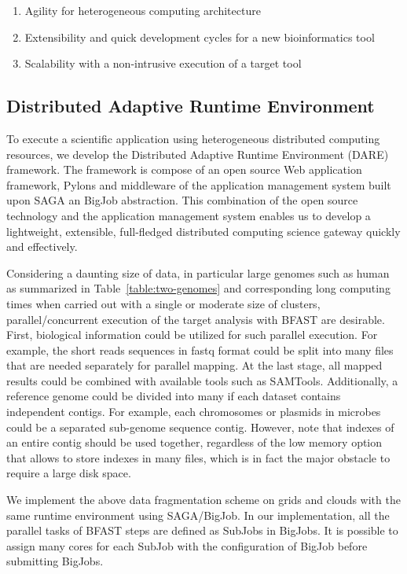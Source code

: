 \documentclass[12pt]{article}
\begin{document}
\begin{enumerate}
\item Agility for heterogeneous computing architecture
\item Extensibility and quick development cycles for a new bioinformatics tool
\item Scalability with a non-intrusive execution of a target tool  
\end{enumerate}

\subsection{Distributed Adaptive Runtime Environment}

To execute a scientific application using heterogeneous distributed computing resources, we develop the Distributed Adaptive Runtime Environment (DARE) framework\cite{dareurl}.  The framework is compose of an open source Web application framework, Pylons
and middleware of the application management system built upon SAGA an BigJob abstraction\cite{saga-ccgrid10,saga-royalsoc,saga-web,jha2009developing,ecmls10}.  This combination of the open source technology and the application management system enables us to develop a lightweight, extensible, full-fledged distributed computing science gateway quickly and effectively\cite{pylonsurl}. 

Considering a daunting size of data, in particular large genomes such as human as summarized in Table~\ref{table:two-genomes} and corresponding long computing times when carried out with a single or moderate size of clusters, parallel/concurrent execution of the target analysis with BFAST are desirable.  First, biological information could be utilized for such parallel execution. For example, the short reads sequences in fastq format could be split into many files that are needed separately for parallel mapping.  At the last stage, all mapped results could be combined with available tools such as SAMTools\cite{samtools}.   Additionally, a reference genome could be divided into many if each dataset contains independent contigs.  For example, each chromosomes or plasmids in microbes could be a separated sub-genome sequence contig.  However, note that indexes of an entire contig should be used together, regardless of the low memory option that allows to store indexes in many files, which is in fact the major obstacle to require a large disk space.

We implement the above data fragmentation scheme on grids and clouds with the same runtime environment using SAGA/BigJob\cite{saga-royalsoc,saga-ccgrid10, ecmls10}.  In our implementation, all the parallel tasks of BFAST steps are defined as SubJobs in BigJobs.  It is possible to assign many cores for each SubJob with the configuration of BigJob before submitting BigJobs. 
  
\end{document}
